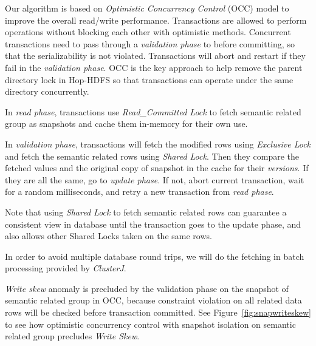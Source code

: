 Our algorithm is based on \textit{Optimistic Concurrency Control} (OCC) model to improve the overall read/write performance. Transactions are allowed to perform operations without blocking each other with optimistic methods. Concurrent transactions need to pass through a \textit{validation phase} to before committing, so that the serializability is not violated. Transactions will abort and restart if they fail in the \textit{validation phase}. OCC is the key approach to help remove the parent directory lock in Hop-HDFS so that transactions can operate under the same directory concurrently.

\noindent In \textit{read phase}, transactions use \textit{Read\_Committed Lock} to fetch semantic related group as snapshots and cache them in-memory for their own use.

\noindent In \textit{validation phase}, transactions will fetch the modified rows using \textit{Exclusive Lock} and fetch the semantic related rows using \textit{Shared Lock}. Then they compare the fetched values and the original copy of snapshot in the cache for their \textit{versions}. If they are all the same, go to \textit{update phase}. If not, abort current transaction, wait for a random milliseconds, and retry a new transaction from \textit{read phase}.

\noindent Note that using \textit{Shared Lock} to fetch semantic related rows can guarantee a consistent view in database until the transaction goes to the update phase, and also allows other Shared Locks taken on the same rows. 

\noindent In order to avoid multiple database round trips, we will do the fetching in batch processing provided by \textit{ClusterJ}.

\noindent \textit{Write skew} anomaly is precluded by the validation phase on the snapshot of semantic related group in OCC, because constraint violation on all related data rows will be checked before transaction committed. See Figure~\ref{fig:snapwriteskew} to see how optimistic concurrency control with snapshot isolation on semantic related group precludes \textit{Write Skew}.

